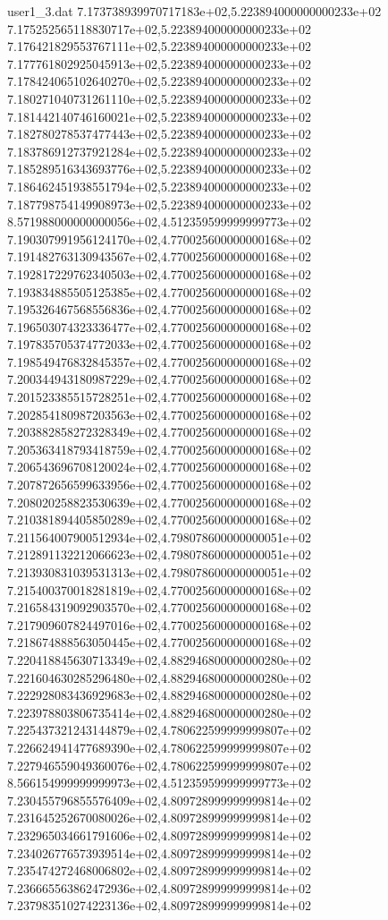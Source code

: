 \begin{filecontents}{user1_3.dat}
7.173738939970717183e+02,5.223894000000000233e+02
7.175252565118830717e+02,5.223894000000000233e+02
7.176421829553767111e+02,5.223894000000000233e+02
7.177761802925045913e+02,5.223894000000000233e+02
7.178424065102640270e+02,5.223894000000000233e+02
7.180271040731261110e+02,5.223894000000000233e+02
7.181442140746160021e+02,5.223894000000000233e+02
7.182780278537477443e+02,5.223894000000000233e+02
7.183786912737921284e+02,5.223894000000000233e+02
7.185289516343693776e+02,5.223894000000000233e+02
7.186462451938551794e+02,5.223894000000000233e+02
7.187798754149908973e+02,5.223894000000000233e+02
8.571988000000000056e+02,4.512359599999999773e+02
7.190307991956124170e+02,4.770025600000000168e+02
7.191482763130943567e+02,4.770025600000000168e+02
7.192817229762340503e+02,4.770025600000000168e+02
7.193834885505125385e+02,4.770025600000000168e+02
7.195326467568556836e+02,4.770025600000000168e+02
7.196503074323336477e+02,4.770025600000000168e+02
7.197835705374772033e+02,4.770025600000000168e+02
7.198549476832845357e+02,4.770025600000000168e+02
7.200344943180987229e+02,4.770025600000000168e+02
7.201523385515728251e+02,4.770025600000000168e+02
7.202854180987203563e+02,4.770025600000000168e+02
7.203882858272328349e+02,4.770025600000000168e+02
7.205363418793418759e+02,4.770025600000000168e+02
7.206543696708120024e+02,4.770025600000000168e+02
7.207872656599633956e+02,4.770025600000000168e+02
7.208020258823530639e+02,4.770025600000000168e+02
7.210381894405850289e+02,4.770025600000000168e+02
7.211564007900512934e+02,4.798078600000000051e+02
7.212891132212066623e+02,4.798078600000000051e+02
7.213930831039531313e+02,4.798078600000000051e+02
7.215400370018281819e+02,4.770025600000000168e+02
7.216584319092903570e+02,4.770025600000000168e+02
7.217909607824497016e+02,4.770025600000000168e+02
7.218674888563050445e+02,4.770025600000000168e+02
7.220418845630713349e+02,4.882946800000000280e+02
7.221604630285296480e+02,4.882946800000000280e+02
7.222928083436929683e+02,4.882946800000000280e+02
7.223978803806735414e+02,4.882946800000000280e+02
7.225437321243144879e+02,4.780622599999999807e+02
7.226624941477689390e+02,4.780622599999999807e+02
7.227946559049360076e+02,4.780622599999999807e+02
8.566154999999999973e+02,4.512359599999999773e+02
7.230455796855576409e+02,4.809728999999999814e+02
7.231645252670080026e+02,4.809728999999999814e+02
7.232965034661791606e+02,4.809728999999999814e+02
7.234026776573939514e+02,4.809728999999999814e+02
7.235474272468006802e+02,4.809728999999999814e+02
7.236665563862472936e+02,4.809728999999999814e+02
7.237983510274223136e+02,4.809728999999999814e+02

\end{filecontents}
